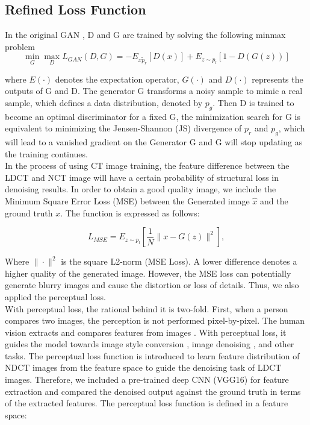 \documentclass[journal]{IEEEtran}
\begin{document}
\subsection{Refined Loss Function}
\label{loss function}
In the original GAN \cite{goodfellow2014generative}, D and G are trained by solving the following minmax problem\\

\begin{equation}
	\mathop{min}_{G}\mathop{max}_{D} L_{GAN}(D,G) = -E_{x \tilde p_r}[D(x)] + E_{z \sim p_l}[1-D(G(z))]
\end{equation}

where $E(\cdot)$ denotes the expectation operator, $G(\cdot)$ and $D(\cdot)$ represents the outputs of G and D.  The generator G transforms a noisy sample to mimic a real sample, which defines a data distribution, denoted by $p_g$.  Then D is trained to become an optimal discriminator for a fixed G, the minimization search for G is equivalent to minimizing the Jensen-Shannon (JS) divergence of $p_r$ and $p_g$, which will lead to a vanished gradient on the Generator G  \cite{8340157} and G will stop updating as the training continues.  \\
	In the process of using CT image training, the feature difference between the LDCT and NCT image will have a certain probability of structural loss in denoising results.  In order to obtain a good quality image, we include the Minimum Square Error Loss (MSE) between the Generated image $\hat{x}$ and the ground truth $x$.  The function is expressed as follows:
	
\begin{equation}
	L_{MSE} = E_{z\sim p_l}\left[ \frac{1}{N}\|x - G(z)\|^2 \right],
\end{equation}
	
Where $\|\cdot\|^2$ is the square L2-norm (MSE Loss).  A lower difference denotes a higher quality of the generated image.  However, the MSE loss can potentially generate blurry images and cause the distortion or loss of details.  Thus, we also applied the perceptual loss.\\
	With perceptual loss, the rational behind it is two-fold.  First, when a person compares two images, the perception is not performed pixel-by-pixel.  The human vision extracts and compares features from images \cite{nixon2019feature}.  With perceptual loss, it guides the model towards image style conversion \cite{johnson2016perceptual}, image denoising \cite{8340157}, and other tasks.  The perceptual loss function is introduced to learn feature distribution of NDCT images from the feature space to guide the denoising task of LDCT images.  Therefore, we included a pre-trained deep CNN (VGG16) for feature extraction and compared the denoised output against the ground truth in terms of the extracted features.  The perceptual loss function is defined in a feature space:
	
\end{document}
